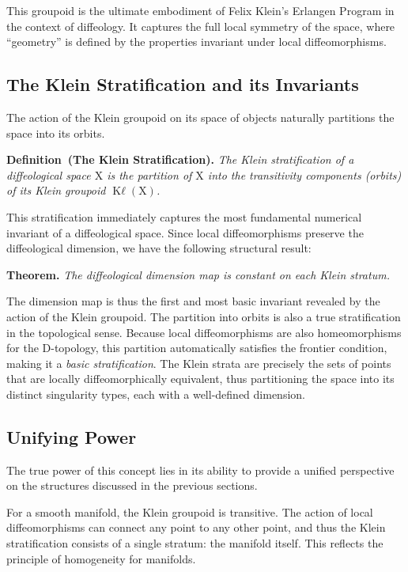 \documentclass[10pt,reqno,letterpaper,twoside]{amsart}
\theoremstyle{article}
\newenvironment{definition}[1]%
{\noindent\textbf{Definition#1.} \it}%
{}
\newenvironment{theorem}[1]%
{\noindent\textbf{Theorem#1.} \it}%
{}
\def \K{\mathrm K}
\def \X{\mathrm X}
\DeclareMathOperator{\Kl}{{\K\ell}}
\begin{document}
  This groupoid is the ultimate embodiment of Felix Klein's Erlangen Program in the context of diffeology.
  It captures the full local symmetry of the space, where ``geometry'' is defined by the properties invariant under local diffeomorphisms.
  
  \subsection{The Klein Stratification and its Invariants}
  
  The action of the Klein groupoid on its space of objects naturally partitions the space into its orbits.
  
  \begin{definition}{~(The Klein Stratification)}
    The Klein stratification of a diffeological space $\X$ is the partition of $\X$ into the transitivity components (orbits) of its Klein groupoid $\Kl(\X)$.
  \end{definition}
  
  This stratification immediately captures the most fundamental numerical invariant of a diffeological space.
  Since local diffeomorphisms preserve the diffeological dimension,
  we have the following structural result:
  
  \begin{theorem}{}
    The diffeological dimension map is constant on each Klein stratum.
  \end{theorem}
  
  The dimension map is thus the first and most basic invariant revealed by the action of the Klein groupoid.
  The partition into orbits is also a true stratification in the topological sense.
  Because local diffeomorphisms are also homeomorphisms for the D-topology,
  this partition automatically satisfies the frontier condition,
  making it a \emph{basic stratification}.
  The Klein strata are precisely the sets of points that are locally diffeomorphically equivalent,
  thus partitioning the space into its distinct singularity types,
  each with a well-defined dimension.
  
  \subsection{Unifying Power}
  
  The true power of this concept lies in its ability to provide a unified perspective on the structures discussed in the previous sections.
  
  For a smooth manifold, the Klein groupoid is transitive.
  The action of local diffeomorphisms can connect any point to any other point,
  and thus the Klein stratification consists of a single stratum: the manifold itself.
  This reflects the principle of homogeneity for manifolds.
  
\end{document}
